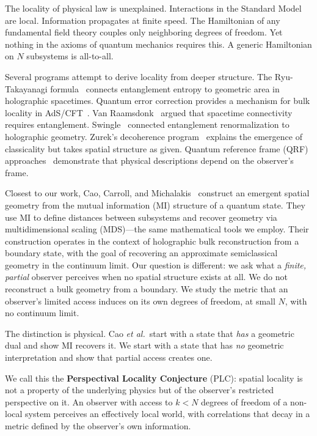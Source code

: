 \documentclass[aps,pra,twocolumn,superscriptaddress]{revtex4-2}
\begin{document}
The locality of physical law is unexplained. Interactions in the Standard Model are local. Information propagates at finite speed. The Hamiltonian of any fundamental field theory couples only neighboring degrees of freedom. Yet nothing in the axioms of quantum mechanics requires this. A generic Hamiltonian on $N$ subsystems is all-to-all.

Several programs attempt to derive locality from deeper structure. The Ryu-Takayanagi formula~\cite{ryu2006} connects entanglement entropy to geometric area in holographic spacetimes. Quantum error correction provides a mechanism for bulk locality in AdS/CFT~\cite{almheiri2015}. Van Raamsdonk~\cite{vanraamsdonk2010} argued that spacetime connectivity requires entanglement. Swingle~\cite{swingle2012} connected entanglement renormalization to holographic geometry. Zurek's decoherence program~\cite{zurek2003} explains the emergence of classicality but takes spatial structure as given. Quantum reference frame (QRF) approaches~\cite{giacomini2019,vanrietvelde2020} demonstrate that physical descriptions depend on the observer's frame.

Closest to our work, Cao, Carroll, and Michalakis~\cite{cao2017} construct an emergent spatial geometry from the mutual information (MI) structure of a quantum state. They use MI to define distances between subsystems and recover geometry via multidimensional scaling (MDS)---the same mathematical tools we employ. Their construction operates in the context of holographic bulk reconstruction from a boundary state, with the goal of recovering an approximate semiclassical geometry in the continuum limit. Our question is different: we ask what a \emph{finite, partial} observer perceives when no spatial structure exists at all. We do not reconstruct a bulk geometry from a boundary. We study the metric that an observer's limited access induces on its own degrees of freedom, at small $N$, with no continuum limit.

The distinction is physical. Cao \textit{et al.}\ start with a state that \emph{has} a geometric dual and show MI recovers it. We start with a state that has \emph{no} geometric interpretation and show that partial access creates one.

We call this the \textbf{Perspectival Locality Conjecture} (PLC): spatial locality is not a property of the underlying physics but of the observer's restricted perspective on it. An observer with access to $k < N$ degrees of freedom of a non-local system perceives an effectively local world, with correlations that decay in a metric defined by the observer's own information.
\end{document}

